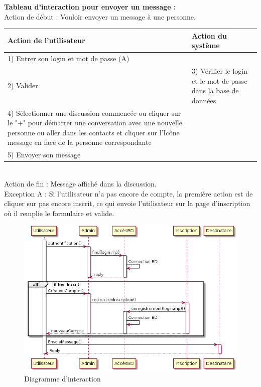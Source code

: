 \documentclass[a4paper,12pt]{article}
\begin{document}
	\textbf{Tableau d’interaction pour envoyer un message :} \\

	Action de début : Vouloir envoyer un message à une personne. \\

	\begin{tabular}{|p{7cm}|p{7cm}|}
		\hline
		Action de l'utilisateur & Action du système\tabularnewline
		\hline

		\hline
		1) Entrer son login et mot de passe (A)  & \tabularnewline

		\hline
		2) Valider  & 3) Vérifier le login et le mot de passe dans la base de données\tabularnewline

		\hline
		4) Sélectionner une discussion commencée ou cliquer sur le "+" pour	démarrer une conversation avec une nouvelle personne ou aller dans les contacts et cliquer sur l’Icône message en face de la personne correspondante & \tabularnewline

		\hline
		5) Envoyer son message  & \tabularnewline
		\hline
	\end{tabular}

~\\

	Action de fin  : Message affiché dans la discussion. \\

	Exception A : Si l'utilisateur n'a pas encore de compte, la première action est de cliquer sur pas encore inscrit, ce qui envoie l'utilisateur sur la page d'inscription où il remplie le formulaire et valide.

	\begin{figure}[H]
		\centerline{\includegraphics[width=12.5cm]{../diagrammes/img/interaction.png}}
		\caption{Diagramme d’interaction}
	\end{figure}
\end{document}
